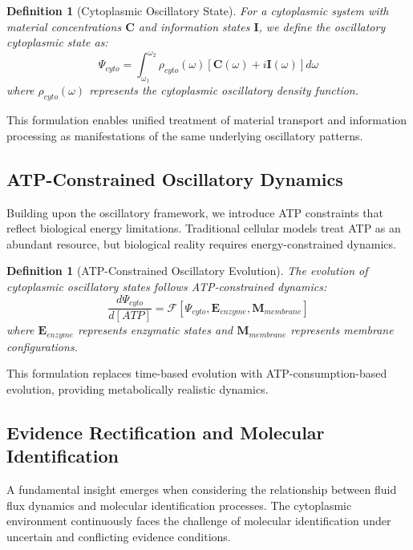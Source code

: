 \documentclass[12pt,a4paper]{article}
\newtheorem{definition}[theorem]{Definition}
\begin{document}
\begin{definition}[Cytoplasmic Oscillatory State]
For a cytoplasmic system with material concentrations $\mathbf{C}$ and information states $\mathbf{I}$, we define the oscillatory cytoplasmic state as:
\begin{equation}
\Psi_{cyto} = \int_{\omega_1}^{\omega_2} \rho_{cyto}(\omega) [\mathbf{C}(\omega) + i\mathbf{I}(\omega)] d\omega
\end{equation}
where $\rho_{cyto}(\omega)$ represents the cytoplasmic oscillatory density function.
\end{definition}

This formulation enables unified treatment of material transport and information processing as manifestations of the same underlying oscillatory patterns.

\subsection{ATP-Constrained Oscillatory Dynamics}

Building upon the oscillatory framework, we introduce ATP constraints that reflect biological energy limitations. Traditional cellular models treat ATP as an abundant resource, but biological reality requires energy-constrained dynamics.

\begin{definition}[ATP-Constrained Oscillatory Evolution]
The evolution of cytoplasmic oscillatory states follows ATP-constrained dynamics:
\begin{equation}
\frac{d\Psi_{cyto}}{d[ATP]} = \mathcal{F}[\Psi_{cyto}, \mathbf{E}_{enzyme}, \mathbf{M}_{membrane}]
\end{equation}
where $\mathbf{E}_{enzyme}$ represents enzymatic states and $\mathbf{M}_{membrane}$ represents membrane configurations.
\end{definition}

This formulation replaces time-based evolution with ATP-consumption-based evolution, providing metabolically realistic dynamics.

\subsection{Evidence Rectification and Molecular Identification}

A fundamental insight emerges when considering the relationship between fluid flux dynamics and molecular identification processes. The cytoplasmic environment continuously faces the challenge of molecular identification under uncertain and conflicting evidence conditions.
\end{document}
